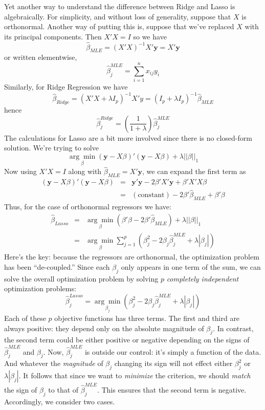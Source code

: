 \documentclass[12pt]{article}
\theoremstyle{definition}
\begin{document}
Yet another way to understand the difference between Ridge and Lasso is algebraically. For simplicity, and without loss of generality, suppose that $X$ is orthonormal. Another way of putting this is, suppose that we've replaced $X$ with its principal components. Then $X'X = I$ so we have
	$$\widehat{\beta}_{MLE} = (X'X)^{-1}X'\textbf{y} = X'\textbf{y}$$
or written elementwise,
	$$\widehat{\beta}^{MLE}_j = \sum_{i=1}^n x_{ij}y_i$$
Similarly, for Ridge Regression we have
	$$\widehat{\beta}_{Ridge} =\left(X'X + \lambda I_p \right)^{-1}X'y = \left(I_p + \lambda I_p \right)^{-1} \widehat{\beta}_{MLE}$$
hence
	$$\widehat{\beta}^{Ridge}_j =  \left(\frac{1}{1+\lambda}\right)\widehat{\beta}^{MLE}_j$$
The calculations for Lasso are a bit more involved since there is no closed-form solution. We're trying to solve
	$$\underset{\beta}{\arg \min} (\mathbf{y}  - X\beta)' (\mathbf{y} - X\beta) + \lambda \left| \left| \beta\right| \right|_1$$
Now using $X'X = I$ along with $\widehat{\beta}_{MLE} = X'\textbf{y}$, we can expand the first term as
	\begin{eqnarray*}
		 (\mathbf{y}  - X\beta)' (\mathbf{y} - X\beta) &=& \mathbf{y}'\mathbf{y} - 2\beta' X' \mathbf{y} + \beta' X'X \beta \\
		 	&=& (\mbox{constant}) - 2\beta' \widehat{\beta}_{MLE} + \beta'\beta
	\end{eqnarray*}
Thus, for the case of orthonormal regressors we have:
\begin{eqnarray*}
	\widehat{\beta}_{Lasso} &=& \underset{\beta}{\arg \min} (\beta'\beta - 2\beta' \widehat{\beta}_{MLE})  +  \lambda \left| \left| \beta\right| \right|_1\\
		&=& \underset{\beta}{\arg \min}  \sum_{j=1}^p \left(\beta_j^2 - 2 \beta_j \widehat{\beta}^{MLE}_j + \lambda\left|\beta_j \right|\right)
\end{eqnarray*}
Here's the key: because the regressors are orthonormal, the optimization problem has been ``de-coupled.'' Since each $\beta_j$ only appears in one term of the sum, we can solve the overall optimization problem by solving $p$ \emph{completely independent} optimization problems:
	$$\widehat{\beta}^{Lasso}_j = \underset{\beta_j}{\arg \min} \left(\beta_j^2 - 2 \beta_j \widehat{\beta}^{MLE}_j + \lambda\left|\beta_j \right|\right)$$
Each of these $p$ objective functions has three terms. The first and third are always positive: they depend only on the absolute magnitude of $\beta_j$. In contrast, the second term could be either positive or negative depending on the signs of $\widehat{\beta}^{MLE}_j$ and $\beta_j$. Now, $\widehat{\beta}^{MLE}_j$ is outside our control: it's simply a function of the data. And whatever the \emph{magnitude} of $\beta_j$ changing its sign will not effect either $\beta_j^2$ or $\lambda|\beta_j|$. It follows that since we want to \emph{minimize} the criterion, we should \emph{match} the sign of $\beta_j$ to that of $\widehat{\beta}^{MLE}_j$. This ensures that the second term is negative. Accordingly, we consider two cases. 
\end{document}
